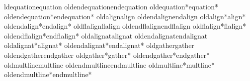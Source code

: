 \let\ts\intercal
\def\ts{\tn{$\textsf{T}$}}
\def\ts{\textsf{\textup{T}}}

\def\cpwl{\textsf{\textup{CPwL}}}
\let\cpl\cpwl
\let\CPwL\cpwl
\newcommand{\din}{{d_\tn{in}}}
\newcommand{\dout}{{d_\tn{out}}}
\newcommand{\dprime}{{\prime\prime}}
\newcommand{\tprime}{{\prime\prime\prime}}

\DeclareMathOperator*{\argmax}{arg\,max}
\DeclareMathOperator*{\argmin}{arg\,min}


\usepackage[left,mathlines]{lineno}
\usepackage{refcount}

\renewcommand\thelinenumber{{\rmfamily\upshape\normalsize\color{blue}\arabic{linenumber}}}
\renewcommand\LineNumber{{\rmfamily\upshape\footnotesize\color{mylinenumbercolor}\arabic{linenumber}}}
\linenumbers
\newcommand{\mylinelabel}[1]{\phantomsection\label{#1zsj}\linelabel{#1}}
\makeatletter
\newcommand*\patchAmsMathEnvironmentForLineno[1]{%
	\expandafter\let\csname old#1\expandafter\endcsname\csname #1\endcsname
	\expandafter\let\csname oldend#1\expandafter\endcsname\csname end#1\endcsname
	\renewenvironment{#1}%
	{\linenomath\csname old#1\endcsname}%
	{\csname oldend#1\endcsname\endlinenomath}}%
\newcommand*\patchBothAmsMathEnvironmentsForLineno[1]{%
	\patchAmsMathEnvironmentForLineno{#1}%
	\patchAmsMathEnvironmentForLineno{#1*}}%
\patchBothAmsMathEnvironmentsForLineno{equation}%
\patchBothAmsMathEnvironmentsForLineno{align}%
\patchBothAmsMathEnvironmentsForLineno{flalign}%
\patchBothAmsMathEnvironmentsForLineno{alignat}%
\patchBothAmsMathEnvironmentsForLineno{gather}%
\patchBothAmsMathEnvironmentsForLineno{multline}%
\makeatother

\newcommand{\mailto}[2][]{\href{mailto:#2?cc=#1}{\color{black}#2}}



\let\tilde\widetilde
\let\hat\widehat
\let\epsilon\varepsilon
\let\eps\varepsilon
\let\subset\subseteq
\let\tn\textnormal
\newcommand{\customcdots}{%
	\mathinner{\mkern-0.1mu\cdotp\mkern-0.3mu\cdotp\mkern-0.3mu\cdotp\mkern-0.1mu}%
}
\let\cdots\customcdots
\let\myforall\forall
\def\forall{{\myforall\, }}
\let\myexists\exists
\def\exists{{\myexists\, }}
\let\emptyset\varnothing
\long{}
\long{}
\long{}
\long{}
\long{}


